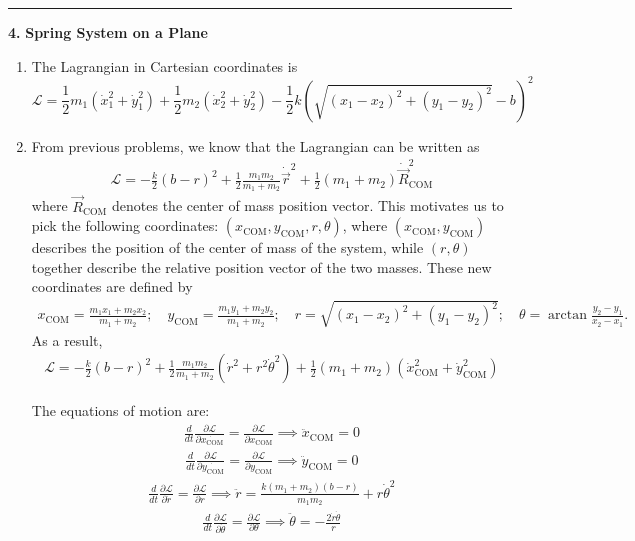 \documentclass{article}
\theoremstyle{definition}
\newcommand{\p}{\partial}
\newcommand{\lag}{\mathcal{L}}
\newcommand{\f}[2]{\frac{#1}{#2}}
\newcommand{\lp}{\left(}
\newcommand{\rp}{\right)}
\begin{document}
\hrule

$\,$\\




\noindent \textbf{4.} \textbf{Spring System on a Plane}

\begin{enumerate}[label = (\alph*)]
	\item The Lagrangian in Cartesian coordinates is 
	\begin{equation*}
	\boxed{
	\lag = \f{1}{2}m_1(\dot{x}_1^2 + \dot{y}_1^2)+ \f{1}{2}m_2(\dot{x}_2^2 + \dot{y}_2^2) - \f{1}{2}k \lp \sqrt{(x_1-x_2)^2+(y_1-y_2)^2} -b \rp^2
	}
	\end{equation*}
	
	
	
	
	\item From previous problems, we know that the Lagrangian can be written as 
	\begin{align*}
	\lag = -\f{k}{2} (b-r)^2+  \f{1}{2}\frac{m_1m_2 }{m_1+m_2} \dot{\vec{r}}^2
	+\frac{1}{2}(m_1+m_2) \dot{\vec{R}}_\text{COM}^2
	\end{align*}
	where $\vec{R}_\text{COM}$ denotes the center of mass position vector. This motivates us to pick the following coordinates:  $(x_\text{COM},y_{\text{COM}},r,\theta)$, where $(x_\text{COM}, y_\text{COM})$ describes the position of the center of mass of the system, while $(r,\theta)$ together describe the relative position vector of the two masses. These new coordinates are defined by 
	\begin{align*}
	x_\text{COM} = \f{m_1 x_1 + m_2 x_2}{m_1+m_2}; \quad y_\text{COM} = \f{m_1 y_1 + m_2 y_2}{m_1+m_2}; \quad r= \sqrt{(x_1-x_2)^2+(y_1-y_2)^2}; \quad \theta = \arctan\f{y_2-y_1}{x_2-x_1}.
	\end{align*}
	As a result,
	\begin{align*}
	\boxed{\lag = -\f{k}{2} (b-r)^2+  \f{1}{2}\frac{m_1m_2 }{m_1+m_2} \left(\dot r^2+r^2 \dot\theta^2\right)
	+\frac{1}{2}(m_1+m_2) \left(\dot{x}_\text{COM}^2+\dot{y}_\text{COM}^2\right)}
	\end{align*}
	
	The equations of motion are:
	\begin{align*}
	\f{d}{dt}\f{\p \lag}{\p \dot{x_\text{COM}}} = \f{\p \lag}{\p x_\text{COM}}
	\implies \ddot{x}_\text{COM} = 0
	\end{align*}
	\begin{align*}
	\f{d}{dt}\f{\p \lag}{\p \dot{y_\text{COM}}} = \f{\p \lag}{\p y_\text{COM}} \implies \ddot{y}_\text{COM} = 0
	\end{align*}
	\begin{align*}
	\f{d}{dt}\f{\p \lag}{\p \dot{r}} = \f{\p \lag}{\p r}
	\implies \ddot{r} = \f{k(m_1+m_2)(b-r)}{m_1m_2} + r\dot{\theta}^2
	\end{align*}
	\begin{align*}
	\f{d}{dt}\f{\p \lag}{\p \dot{\theta}} = \f{\p \lag}{\p \theta}\implies \ddot{\theta}  = -\f{2\dot{r}\dot{\theta}}{r}
	\end{align*}


\end{enumerate}
\end{document}

